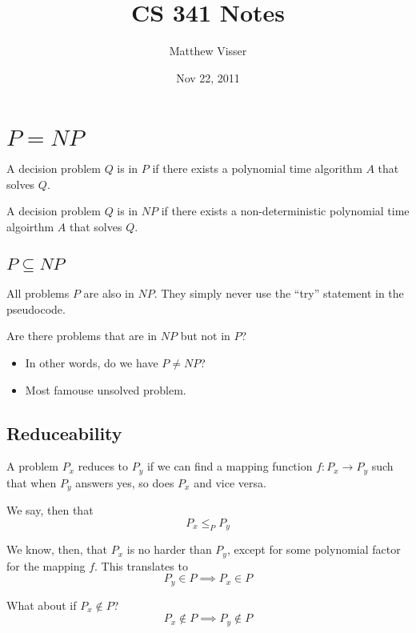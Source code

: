 \documentclass[12pt]{article}
\begin{document}
\title{CS 341 Notes}
\author{Matthew Visser}
\date{Nov 22, 2011}
\maketitle

\section{$P = NP$}

A decision problem $Q$ is in $P$ if there exists a polynomial time algorithm $A$
that solves $Q$.

A decision problem $Q$ is in $NP$ if there exists a non-deterministic polynomial
time algoirthm $A$ that solves $Q$.

\subsection{$P \subseteq NP$}

All problems $P$ are also in $NP$. They simply never use the ``try'' statement
in the pseudocode.

Are there problems that are in $NP$ but not in $P$?
\begin{itemize}
	\item In other words, do we have $P \neq NP$?
	\item Most famouse unsolved problem.
\end{itemize}

\subsection{Reduceability}

A problem $P_x$ reduces to $P_y$ if we can find a mapping function
$f:P_x \to P_y$ such that when $P_y$ answers yes, so does $P_x$ and vice versa.

We say, then that
\[
P_x \leq_P P_y
\]

We know, then, that $P_x$ is no harder than $P_y$, except for some polynomial
factor for the mapping $f$. This translates to
\[
P_y \in P \implies P_x \in P
\]

What about if $P_x \notin P$?
\[
P_x \notin P \implies P_y \notin P
\]
\end{document}
